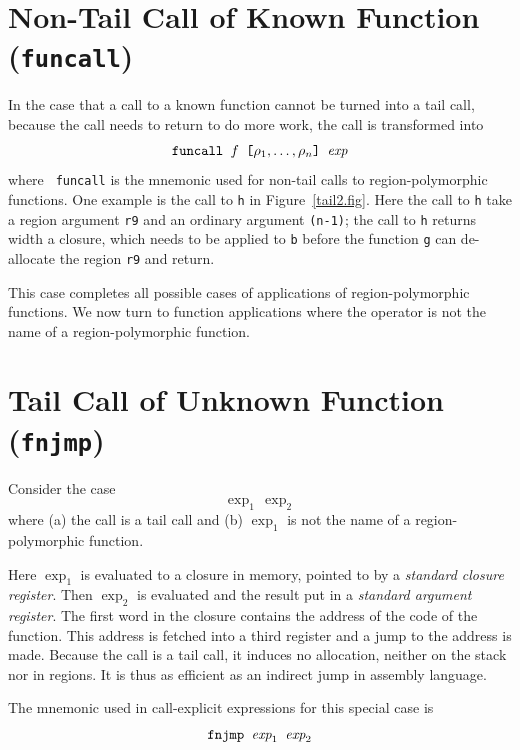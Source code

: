 \documentclass[12pt]{book}
\begin{document}
\section{Non-Tail Call of Known Function ({\tt funcall})}
In the case that a call to a known function cannot be turned into a
tail call, because the call needs to return to do more work, the call
is transformed into
$$\hbox{\tt funcall $f$ [$\rho_1, \ldots, \rho_n$] $\hbox{\it exp}$}$$
where {\tt
  funcall} is the mnemonic used for non-tail calls to
region-polymorphic functions. One example is the call to {\tt h} in
Figure~\ref{tail2.fig}. Here the call to {\tt h} take a region
argument {\tt r9} and an ordinary argument {\tt (n-1)}; the call to
{\tt h} returns width a closure, which needs to be applied to {\tt b}
before the function {\tt g} can de-allocate the region {\tt r9} and
return.

This case completes all possible cases of applications of
region-polymorphic functions. We now turn to function applications
where the operator is not the name of a region-polymorphic function.

\section{Tail Call of Unknown Function ({\tt fnjmp})}
Consider the case
$$\exp_1\,\exp_2$$
where (a) the call is a tail call and (b) $\exp_1$
is not the name of a region-polymorphic function.

Here $\exp_1$ is evaluated to a closure in memory, pointed to by a 
%
%
{\em standard closure register}. Then $\exp_2$ is evaluated and the result
put in a
%
%
{\em standard argument register}. The first word in the closure
contains the address of the code of the function. This address is
fetched into a third register and a jump to the address is made.
Because the call is a tail call, it induces no allocation, neither on
the stack nor in regions.  It is thus as efficient as an indirect jump
in assembly language.


The mnemonic used in call-explicit expressions for this special case is
$$\hbox{\tt fnjmp $\hbox{\it exp}_1$ $\hbox{\it exp}_2$}$$
\end{document}

